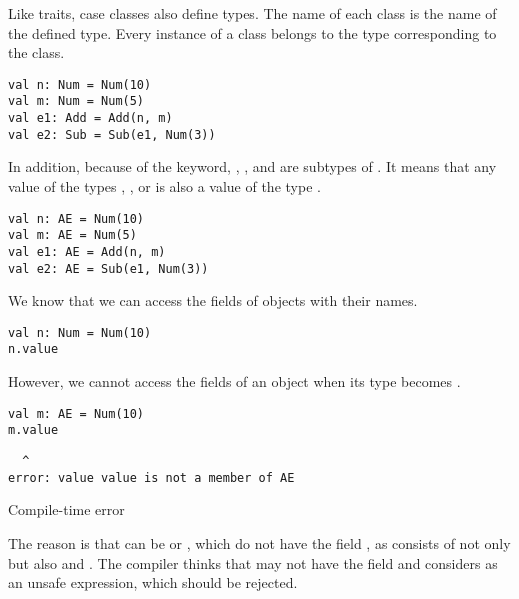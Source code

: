 Like traits, case classes also define types. The name of each class is the name
of the defined type. Every instance of a class belongs to the type corresponding
to the class.

\begin{verbatim}
val n: Num = Num(10)
val m: Num = Num(5)
val e1: Add = Add(n, m)
val e2: Sub = Sub(e1, Num(3))
\end{verbatim}

In addition, because of the  keyword, , , and
 are subtypes of . It means that any value of the types
, , or  is also a value of the type .

\begin{verbatim}
val n: AE = Num(10)
val m: AE = Num(5)
val e1: AE = Add(n, m)
val e2: AE = Sub(e1, Num(3))
\end{verbatim}

We know that we can access the fields of objects with their names.

\begin{verbatim}
val n: Num = Num(10)
n.value
\end{verbatim}

However, we cannot access the fields of an object when its type becomes .

\begin{verbatim}
val m: AE = Num(10)
m.value
\end{verbatim}
\vspace{-1em}
\begin{mdframed}[hidealllines=true,backgroundcolor=gray!10,innerleftmargin=3pt,innerrightmargin=3pt,leftmargin=-3pt,rightmargin=-3pt]
\begin{verbatim}
  ^
error: value value is not a member of AE
\end{verbatim}
\vspace{-2em}
\begin{flushright}
\scriptsize\textsf{Compile-time error}
\end{flushright}
\end{mdframed}

The reason is that  can be  or , which do not have
the field , as  consists of not only  but also
 and . The compiler thinks that  may not have the
field  and considers  as an unsafe expression, which
should be rejected.


